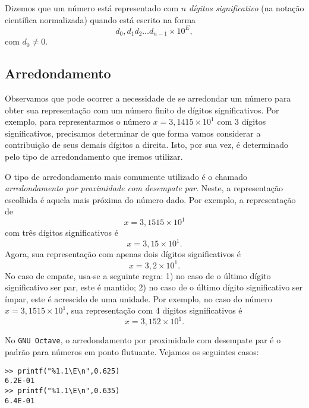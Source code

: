 Dizemos que um número está representado com $n$ \emph{dígitos significativo} (na notação científica normalizada) quando está escrito na forma
\begin{equation}
  d_0,d_{1}d_{2}\ldots d_{n-1}\times 10^{E},
\end{equation}
com $d_0\neq 0$. 

\subsection{Arredondamento}

Observamos que pode ocorrer a necessidade de se arredondar um número para obter sua representação com um número finito de dígitos significativos. Por exemplo, para representarmos o número $x=3,1415\times 10^1$ com 3 dígitos significativos, precisamos determinar de que forma vamos considerar a contribuição de seus demais dígitos a direita. Isto, por sua vez, é determinado pelo tipo de arredondamento que iremos utilizar.

O tipo de arredondamento mais comumente utilizado é o chamado \emph{arredondamento por proximidade com desempate par}. Neste, a representação escolhida é aquela mais próxima do número dado. Por exemplo, a representação de 
\begin{equation}
  x=3,1515\times 10^1
\end{equation}
 com três dígitos significativos é 
 \begin{equation}
   x=3,15\times 10^{1}. 
\end{equation}
Agora, sua representação com apenas dois dígitos significativos é
\begin{equation}
  x=3,2\times 10^{1}.
\end{equation}
No caso de empate, usa-se a seguinte regra: 1) no caso de o último dígito significativo ser par, este é mantido; 2) no caso de o último dígito significativo ser ímpar, este é acrescido de uma unidade. Por exemplo, no caso do número $x=3,1515\times 10^1$, sua representação com 4 dígitos significativos é
\begin{equation}
  x = 3,152\times 10^1.
\end{equation}

\ifisoctave
No \verb+GNU Octave+, o arredondamento por proximidade com desempate par é o padrão para números em ponto flutuante. Vejamos os seguintes casos:
\begin{verbatim}
>> printf("%1.1\E\n",0.625)
6.2E-01
>> printf("%1.1\E\n",0.635)
6.4E-01
\end{verbatim}
\fi

